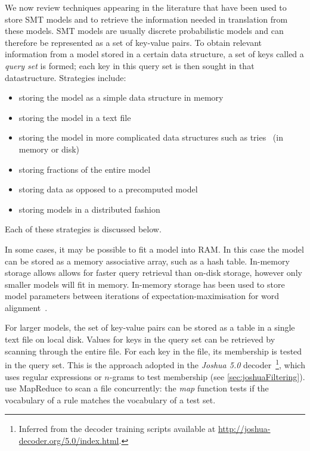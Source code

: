 We now review techniques appearing in the literature that have been used to
store SMT models and to retrieve the information needed in translation from
these models. SMT models are usually discrete probabilistic models and can
therefore be represented as a set of key-value pairs. To obtain relevant
information from a model stored in a certain data structure, a set of keys called a
\emph{query set} is formed; each key in this query set is then sought in that
datastructure. Strategies include:
%
\begin{itemize}
  \item storing the model as a simple data structure in memory
  \item storing the model in a text file
  \item storing the model in more complicated data structures such as
    tries~\citep{fredkin:1960:ACM} (in memory or disk)
  \item storing fractions of the entire model
  \item storing data as opposed to a precomputed model
  \item storing models in a distributed fashion
\end{itemize}
%
Each of these
strategies is discussed below.

In some cases, it may be possible to fit a model into RAM. In
this case the model can be stored as a memory associative array, such as a hash
table. In-memory storage allows allows for faster query retrieval than
on-disk storage, however only smaller models will fit in memory.
In-memory storage has been used to store model
parameters between iterations of expectation-maximisation for word
alignment~\citep{dyer-cordova-mont-lin:2008:WMT,lin-dyer:2010:book}.

For larger models, the set of key-value pairs can be stored as a table in a
single text file on local disk. Values for keys in the query set can be retrieved
by scanning through the entire file. For each key in the file, its membership is
tested in the query set. This is the approach adopted in the \emph{Joshua 5.0}
decoder~\citep{post-ganitkevitch-orland-weese-cao-callisonburch:2013:WMT}\footnote{Inferred from the decoder training
scripts available at \url{http://joshua-decoder.org/5.0/index.html}.}, which
uses regular expressions or $n$-grams to test
membership (see \autoref{sec:joshuaFiltering}).
\citet{venugopal-zollmann:2009:PBML} use MapReduce to scan a file concurrently:
the \emph{map} function tests if the vocabulary of a rule matches the
vocabulary of a test set.

